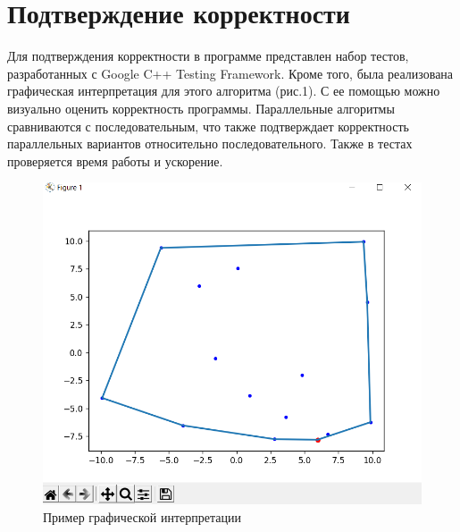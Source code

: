 \documentclass{report}
\begin{document}
\newpage

\section*{Подтверждение корректности}
Для подтверждения корректности в программе представлен набор тестов, разработанных с  Google C++ Testing Framework. Кроме того, была реализована графическая интерпретация для этого алгоритма (рис.1). С ее помощью можно визуально оценить корректность программы. Параллельные алгоритмы сравниваются с последовательным, что также подтверждает корректность параллельных вариантов относительно последовательного. Также в тестах проверяется время работы и ускорение.


\begin{figure}[h]
	
	\centering
	
	\includegraphics[width=0.8\linewidth]{graf.png}
	
	\caption{Пример графической интерпретации}
	
	\label{fig:mpr}
	
\end{figure}
\newpage

\end{document}
